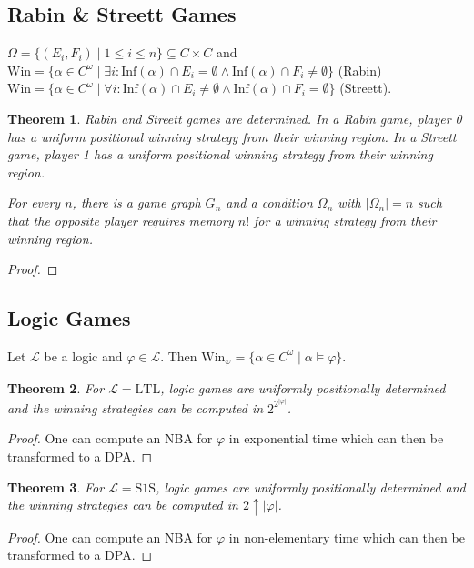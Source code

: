 \documentclass{article}
\newtheorem{theorem}{Theorem}
\begin{document}
\subsection{Rabin \& Streett Games}
$\Omega = \{(E_i, F_i) \mid 1 \leq i \leq n\} \subseteq C \times C$ and \\
$\text{Win} = \{ \alpha \in C^\omega \mid \exists i: \text{Inf}(\alpha) \cap E_i = \emptyset \land \text{Inf}(\alpha) \cap F_i \neq \emptyset \}$ (Rabin) \\
$\text{Win} = \{ \alpha \in C^\omega \mid \forall i: \text{Inf}(\alpha) \cap E_i \neq \emptyset \land \text{Inf}(\alpha) \cap F_i = \emptyset \}$ (Streett).

\begin{theorem}
	Rabin and Streett games are determined. In a Rabin game, player 0 has a uniform positional winning strategy from their winning region. In a Streett game, player 1 has a uniform positional winning strategy from their winning region. 
	
	For every $n$, there is a game graph $G_n$ and a condition $\Omega_n$ with $|\Omega_n| = n$ such that the opposite player requires memory $n!$ for a winning strategy from their winning region.
\end{theorem}
\begin{proof}
\end{proof}

\subsection{Logic Games}
Let $\mathcal{L}$ be a logic and $\varphi \in \mathcal{L}$. Then $\text{Win}_\varphi = \{ \alpha \in C^\omega \mid \alpha \models \varphi \}$.

\begin{theorem}
	For $\mathcal{L} = \text{LTL}$, logic games are uniformly positionally determined and the winning strategies can be computed in $2^{2^{|\varphi|}}$.
\end{theorem}
\begin{proof}
	One can compute an NBA for $\varphi$ in exponential time which can then be transformed to a DPA.
\end{proof}

\begin{theorem}
	For $\mathcal{L} = \text{S1S}$, logic games are uniformly positionally determined and the winning strategies can be computed in $2 \uparrow |\varphi|$.
\end{theorem}
\begin{proof}
	One can compute an NBA for $\varphi$ in non-elementary time which can then be transformed to a DPA.
\end{proof}
\end{document}
